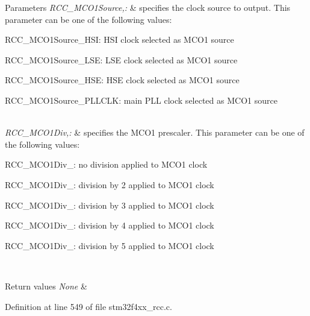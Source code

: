 \begin{DoxyParams}{Parameters}
{\em R\-C\-C\-\_\-\-M\-C\-O1\-Source,\-:} & specifies the clock source to output. This parameter can be one of the following values\-: \begin{DoxyItemize}
\item R\-C\-C\-\_\-\-M\-C\-O1\-Source\-\_\-\-H\-S\-I\-: H\-S\-I clock selected as M\-C\-O1 source \item R\-C\-C\-\_\-\-M\-C\-O1\-Source\-\_\-\-L\-S\-E\-: L\-S\-E clock selected as M\-C\-O1 source \item R\-C\-C\-\_\-\-M\-C\-O1\-Source\-\_\-\-H\-S\-E\-: H\-S\-E clock selected as M\-C\-O1 source \item R\-C\-C\-\_\-\-M\-C\-O1\-Source\-\_\-\-P\-L\-L\-C\-L\-K\-: main P\-L\-L clock selected as M\-C\-O1 source \end{DoxyItemize}
\\
\hline
{\em R\-C\-C\-\_\-\-M\-C\-O1\-Div,\-:} & specifies the M\-C\-O1 prescaler. This parameter can be one of the following values\-: \begin{DoxyItemize}
\item R\-C\-C\-\_\-\-M\-C\-O1\-Div\-\_\-: no division applied to M\-C\-O1 clock \item R\-C\-C\-\_\-\-M\-C\-O1\-Div\-\_\-: division by 2 applied to M\-C\-O1 clock \item R\-C\-C\-\_\-\-M\-C\-O1\-Div\-\_\-: division by 3 applied to M\-C\-O1 clock \item R\-C\-C\-\_\-\-M\-C\-O1\-Div\-\_\-: division by 4 applied to M\-C\-O1 clock \item R\-C\-C\-\_\-\-M\-C\-O1\-Div\-\_\-: division by 5 applied to M\-C\-O1 clock \end{DoxyItemize}
\\
\hline
\end{DoxyParams}

\begin{DoxyRetVals}{Return values}
{\em None} & \\
\hline
\end{DoxyRetVals}


Definition at line 549 of file stm32f4xx\-\_\-rcc.\-c.

